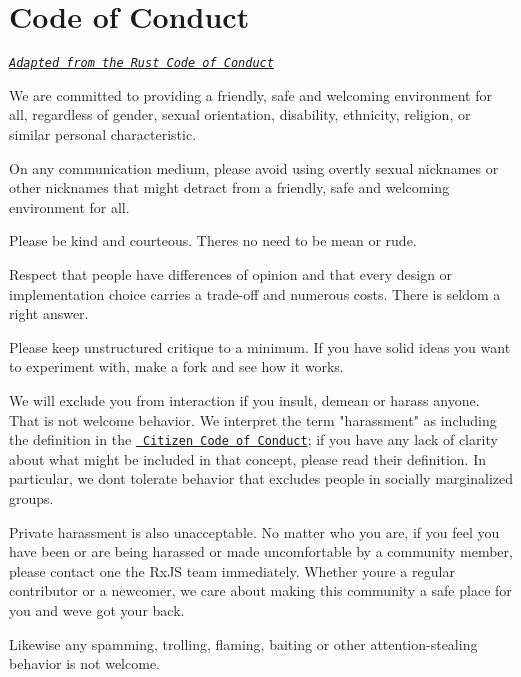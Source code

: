 \chapter{Code of Conduct}
\hypertarget{md__d_1_2_g_i_t_2_food_link_2foodlink_8client_2node__modules_2rx_2code-of-conduct}{}\label{md__d_1_2_g_i_t_2_food_link_2foodlink_8client_2node__modules_2rx_2code-of-conduct}
\label{md__d_1_2_g_i_t_2_food_link_2foodlink_8client_2node__modules_2rx_2code-of-conduct_autotoc_md17871}%
%


\href{https://github.com/rust-lang/rust/wiki/Note-development-policy\#conduct}{\texttt{ {\itshape Adapted from the Rust Code of Conduct}}}

We are committed to providing a friendly, safe and welcoming environment for all, regardless of gender, sexual orientation, disability, ethnicity, religion, or similar personal characteristic.
\begin{DoxyItemize}
\item On any communication medium, please avoid using overtly sexual nicknames or other nicknames that might detract from a friendly, safe and welcoming environment for all.
\item Please be kind and courteous. There\textquotesingle{}s no need to be mean or rude.
\item Respect that people have differences of opinion and that every design or implementation choice carries a trade-\/off and numerous costs. There is seldom a right answer.
\item Please keep unstructured critique to a minimum. If you have solid ideas you want to experiment with, make a fork and see how it works.
\item We will exclude you from interaction if you insult, demean or harass anyone. That is not welcome behavior. We interpret the term "{}harassment"{} as including the definition in the \href{http://citizencodeofconduct.org/}{\texttt{ Citizen Code of Conduct}}; if you have any lack of clarity about what might be included in that concept, please read their definition. In particular, we don\textquotesingle{}t tolerate behavior that excludes people in socially marginalized groups.
\item Private harassment is also unacceptable. No matter who you are, if you feel you have been or are being harassed or made uncomfortable by a community member, please contact one the Rx\+JS team immediately. Whether you\textquotesingle{}re a regular contributor or a newcomer, we care about making this community a safe place for you and we\textquotesingle{}ve got your back.
\item Likewise any spamming, trolling, flaming, baiting or other attention-\/stealing behavior is not welcome. 
\end{DoxyItemize}